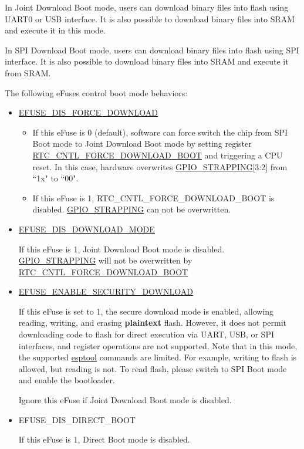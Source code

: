 \documentclass[main\_\_EN.tex]{subfiles}
\begin{document}
In Joint Download Boot mode, users can download binary files into flash using UART0 or USB interface. It is also possible to download binary files into SRAM and execute it in this mode.

In SPI Download Boot mode, users can download binary files into flash using SPI interface. It is also possible to download binary files into SRAM and execute it from SRAM.

The following eFuses control boot mode behaviors:

\begin{itemize}
    \item \hyperref[fielddesc:EFUSEDISFORCEDOWNLOAD]{EFUSE\_DIS\_FORCE\_DOWNLOAD}
    \begin{itemize}
    \item If this eFuse is 0 (default), software can force switch the chip from SPI Boot mode to Joint Download Boot mode by setting register \hyperref[fielddesc:RTCCNTLFORCEDOWNLOADBOOT]{RTC\_CNTL\_FORCE\_DOWNLOAD\_BOOT} and triggering a CPU reset. In this case, hardware overwrites \hyperref[fielddesc:GPIOSTRAPPING]{GPIO\_STRAPPING}[3:2] from ``1x" to ``00".
    \item If this eFuse is 1, RTC\_CNTL\_FORCE\_DOWNLOAD\_BOOT is disabled. \hyperref[fielddesc:GPIOSTRAPPING]{GPIO\_STRAPPING} can not be overwritten.
   \end{itemize}
    \item \hyperref[fielddesc:EFUSEDISDOWNLOADMODE]{EFUSE\_DIS\_DOWNLOAD\_MODE}

    If this eFuse is 1, Joint Download Boot mode is disabled. \hyperref[fielddesc:GPIOSTRAPPING]{GPIO\_STRAPPING} will not be overwritten by \hyperref[fielddesc:RTCCNTLFORCEDOWNLOADBOOT]{RTC\_CNTL\_FORCE\_DOWNLOAD\_BOOT}
    \item \hyperref[fielddesc:EFUSEENABLESECURITYDOWNLOAD]{EFUSE\_ENABLE\_SECURITY\_DOWNLOAD}

    If this eFuse is set to 1, the secure download mode is enabled, allowing reading, writing, and erasing \textbf{plaintext} flash. However, it does not permit downloading code to flash for direct execution via UART, USB, or SPI interfaces, and register operations are not supported. Note that in this mode, the supported \href{https://docs.espressif.com/projects/esptool/en/latest/esp32s3/esptool/index.html}{esptool} commands are limited. For example, writing to flash is allowed, but reading is not. To read flash, please switch to SPI Boot mode and enable the bootloader.

    Ignore this eFuse if Joint Download Boot mode is disabled.

    \item EFUSE\_DIS\_DIRECT\_BOOT

    If this eFuse is 1, Direct Boot mode is disabled.
\end{itemize}
\end{document}
